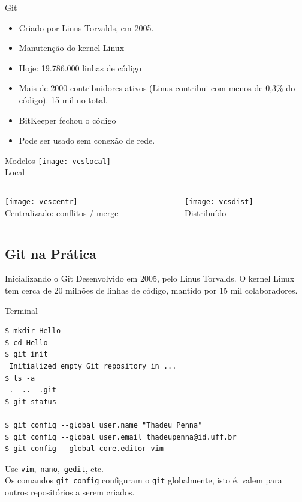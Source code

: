 \begin{frame}{Git}
\begin{itemize}
	\item Criado por Linus Torvalds, em 2005. 
	\item Manutenção do kernel Linux
	\item Hoje: 19.786.000 linhas de código
	\item Mais de 2000 contribuidores ativos (Linus contribui com menos de 0,3\% do código). 15 mil no total.
	\item BitKeeper fechou o código 
	\item Pode ser usado sem conexão de rede.  
\end{itemize}	
\end{frame}

\begin{frame}{Modelos}
	\centering
	\texttt{[image: vcslocal]}\\
	Local
	\begin{columns}
		\begin{column}{0.45\textwidth}
		   \texttt{[image: vcscentr]}\\Centralizado: conflitos / merge 
		\end{column}
		\begin{column}{0.45\textwidth}
			\texttt{[image: vcsdist]}\\
			Distribuído 
			\end{column}
	\end{columns}
\end{frame}

\subsection{Git na Prática}
\begin{frame}[fragile]{Inicializando o Git}
Desenvolvido em 2005, pelo Linus Torvalds. O kernel Linux tem cerca de 20 milhões de linhas de código, mantido por 15 mil colaboradores. 
\begin{terminal}{Terminal}
\begin{Verbatim}[fontseries=b]
$ mkdir Hello
$ cd Hello
$ git init
 Initialized empty Git repository in ... 
$ ls -a
 .  ..  .git
$ git status

$ git config --global user.name "Thadeu Penna"
$ git config --global user.email thadeupenna@id.uff.br
$ git config --global core.editor vim
\end{Verbatim}
\end{terminal}
Use \texttt{vim},~\texttt{nano},~\texttt{gedit}, etc.\\
Os comandos \texttt{git config} configuram o \texttt{git} globalmente, isto é, valem para outros repositórios a serem criados.
\end{frame}


